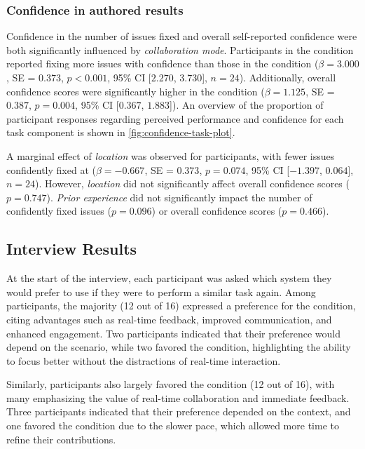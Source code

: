 \subsubsection{Confidence in authored results}
Confidence in the number of issues fixed and overall self-reported confidence were both significantly influenced by \textit{collaboration mode}. Participants in the \sync condition reported fixing more issues with confidence than those in the \async condition ($\beta = 3.000$, SE = $0.373$, $p < 0.001$, 95\% CI [$2.270$, $3.730$], $n=24$). Additionally, overall confidence scores were significantly higher in the \sync condition ($\beta = 1.125$, SE = $0.387$, $p = 0.004$, 95\% CI [$0.367$, $1.883$]). An overview of the proportion of participant responses regarding perceived performance and confidence for each task component is shown in \cref{fig:confidence-task-plot}.

A marginal effect of \textit{location} was observed for \exsitu participants, with fewer issues confidently fixed at \locB ($\beta = -0.667$, SE = $0.373$, $p = 0.074$, 95\% CI [$-1.397$, $0.064$], $n=24$). However, \textit{location} did not significantly affect overall confidence scores ($p = 0.747$). \textit{Prior experience} did not significantly impact the number of confidently fixed issues ($p = 0.096$) or overall confidence scores ($p = 0.466$).

\subsection{Interview Results}
At the start of the interview, each participant was asked which system they would prefer to use if they were to perform a similar task again. Among \insitu participants, the majority (12 out of 16) expressed a preference for the \sync condition, citing advantages such as real-time feedback, improved communication, and enhanced engagement. Two participants indicated that their preference would depend on the scenario, while two favored the \async condition, highlighting the ability to focus better without the distractions of real-time interaction.

Similarly, \exsitu participants also largely favored the \sync condition (12 out of 16), with many emphasizing the value of real-time collaboration and immediate feedback. Three participants indicated that their preference depended on the context, and one favored the \async condition due to the slower pace, which allowed more time to refine their contributions.

